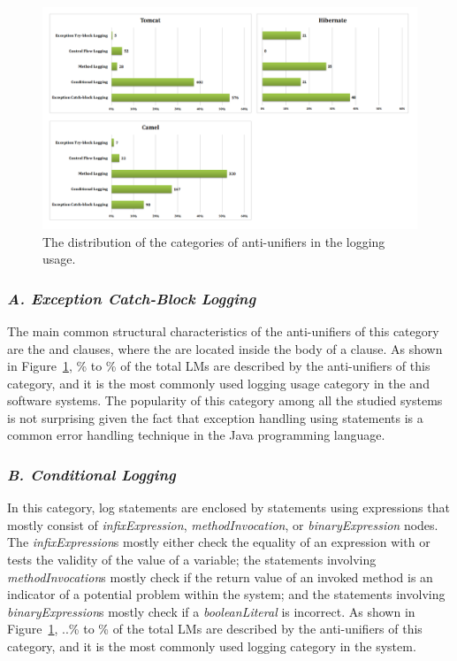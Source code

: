 \begin{figure} [p]
   \centering\includegraphics [width = 1\textwidth, height = 0.7\textheight]{Charts/Categories.png}
  \caption{The distribution of the categories of anti-unifiers in the logging usage.}
  \label{fig:categories}
\end{figure}



\subsubsection{\emph{A. Exception Catch-Block Logging}}  \label{Exception catch-block logging}
The main common structural characteristics of the anti-unifiers of this category are the  and  clauses, where the  are located inside the body of a  clause. As shown in Figure~\ref{fig:categories}, \% to \% of the total LMs are described by the anti-unifiers of this category, and it is the most commonly used logging usage category in the  and  software systems. The popularity of this category among all the studied systems is not surprising given the fact that exception handling using  statements is a common error handling technique in the Java programming language.


\subsubsection{\emph{B. Conditional Logging}}  \label{conditional logging}
In this category, log statements are enclosed by  statements using expressions that mostly consist of \textsl{infixExpression}, \textsl{methodInvocation}, or \textsl{binaryExpression} nodes. The \textsl{infixExpression}s mostly either check the equality of an expression with  or tests the validity of the value of a variable; the  statements involving \textsl{methodInvocation}s mostly check if the return value of an invoked method is an indicator of a potential problem within the system; and the  statements involving \textsl{binaryExpression}s mostly check if a \textsl{booleanLiteral} is incorrect. As shown in Figure~\ref{fig:categories}, ..\% to \% of the total LMs are described by the anti-unifiers of this category, and it is the most commonly used logging category in the  system.

